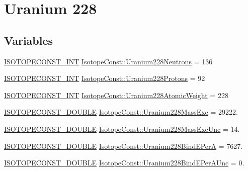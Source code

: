 \hypertarget{group___isotope_const-_uranium-_u228}{}\section{Uranium 228}
\label{group___isotope_const-_uranium-_u228}
\subsection*{Variables}
\begin{DoxyCompactItemize}
\item 
\mbox{\hyperlink{group___isotope_const-_macros_ga5f18360b3e99483a35c32d789e62621c}{I\+S\+O\+T\+O\+P\+E\+C\+O\+N\+S\+T\+\_\+\+I\+NT}} \mbox{\hyperlink{group___isotope_const-_uranium-_u228_ga788617a1cc7e6740ad0af40ff0a6361f}{Isotope\+Const\+::\+Uranium228\+Neutrons}} = 136
\item 
\mbox{\hyperlink{group___isotope_const-_macros_ga5f18360b3e99483a35c32d789e62621c}{I\+S\+O\+T\+O\+P\+E\+C\+O\+N\+S\+T\+\_\+\+I\+NT}} \mbox{\hyperlink{group___isotope_const-_uranium-_u228_ga5337da80ce972219ada1ddb35555e86f}{Isotope\+Const\+::\+Uranium228\+Protons}} = 92
\item 
\mbox{\hyperlink{group___isotope_const-_macros_ga5f18360b3e99483a35c32d789e62621c}{I\+S\+O\+T\+O\+P\+E\+C\+O\+N\+S\+T\+\_\+\+I\+NT}} \mbox{\hyperlink{group___isotope_const-_uranium-_u228_gaec3c36ec69dfac97b6dfe3ba99b303fd}{Isotope\+Const\+::\+Uranium228\+Atomic\+Weight}} = 228
\item 
\mbox{\hyperlink{group___isotope_const-_macros_ga8f45a7272ce02c0b4c65c44636ed719a}{I\+S\+O\+T\+O\+P\+E\+C\+O\+N\+S\+T\+\_\+\+D\+O\+U\+B\+LE}} \mbox{\hyperlink{group___isotope_const-_uranium-_u228_gaee49d86b7ea59daad271e9e6b7fb6f26}{Isotope\+Const\+::\+Uranium228\+Mass\+Exc}} = 29222.
\item 
\mbox{\hyperlink{group___isotope_const-_macros_ga8f45a7272ce02c0b4c65c44636ed719a}{I\+S\+O\+T\+O\+P\+E\+C\+O\+N\+S\+T\+\_\+\+D\+O\+U\+B\+LE}} \mbox{\hyperlink{group___isotope_const-_uranium-_u228_gae5583e1be48539a7fec46907feb0b625}{Isotope\+Const\+::\+Uranium228\+Mass\+Exc\+Unc}} = 14.
\item 
\mbox{\hyperlink{group___isotope_const-_macros_ga8f45a7272ce02c0b4c65c44636ed719a}{I\+S\+O\+T\+O\+P\+E\+C\+O\+N\+S\+T\+\_\+\+D\+O\+U\+B\+LE}} \mbox{\hyperlink{group___isotope_const-_uranium-_u228_gac67c7c69560fd24c77d64fc3574fda18}{Isotope\+Const\+::\+Uranium228\+Bind\+E\+PerA}} = 7627.
\item 
\mbox{\hyperlink{group___isotope_const-_macros_ga8f45a7272ce02c0b4c65c44636ed719a}{I\+S\+O\+T\+O\+P\+E\+C\+O\+N\+S\+T\+\_\+\+D\+O\+U\+B\+LE}} \mbox{\hyperlink{group___isotope_const-_uranium-_u228_gae69adf6ae9fbf86ccde8da857433c1d8}{Isotope\+Const\+::\+Uranium228\+Bind\+E\+Per\+A\+Unc}} = 0.

\end{DoxyCompactItemize}
